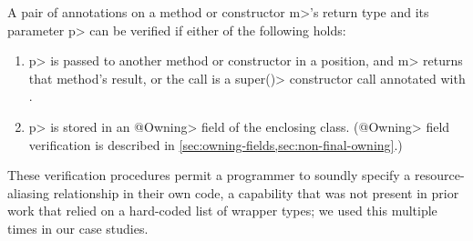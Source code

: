 A pair of \MustCallAlias annotations on a method or constructor \<m>'s return type
and its parameter \<p> can be verified if either of the following holds:
\begin{enumerate}
\item \<p> is passed to another method or constructor in a
  \MustCallAlias position, and \<m> returns that method's result,
  or the call is a \<super()> constructor call annotated
  with \MustCallAlias.
\item \<p> is stored in an \<@Owning> field of the enclosing class.  (\<@Owning>
field verification is described in \cref{sec:owning-fields,sec:non-final-owning}.)
\end{enumerate}
These verification procedures permit a programmer to soundly specify a resource-aliasing
relationship in their own code, a capability that was not present in prior work
that relied on a hard-coded list of wrapper types; we used this
multiple times
in our case studies.



